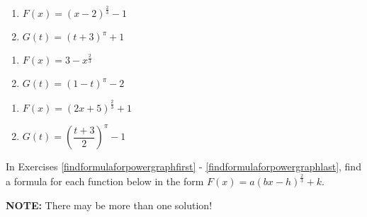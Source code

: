 \documentclass{ximera}
\begin{document}
\begin{multicols}{2}
\begin{enumerate}

\item $F(x) = (x-2)^{\frac{2}{3}}-1$ \label{powergraphexfirst}
\item $G(t) = (t+3)^{\pi} +1$

\setcounter{HW}{\value{enumi}}
\end{enumerate}
\end{multicols}

\begin{multicols}{2}
\begin{enumerate}
\setcounter{enumi}{\value{HW}}
\item $F(x) = 3-x^{\frac{2}{3}}$ 
\item $G(t) = (1-t)^{\pi}-2$  

\setcounter{HW}{\value{enumi}}
\end{enumerate}
\end{multicols}


\begin{multicols}{2}
\begin{enumerate}
\setcounter{enumi}{\value{HW}}

\item $F(x) =(2x+5)^{\frac{2}{3}}+1$ 
\item $G(t) = \left( \dfrac{t+3}{2}\right)^{\pi}-1$ \label{powergraphexlast}
\setcounter{HW}{\value{enumi}}
\end{enumerate}
\end{multicols}

In Exercises \ref{findformulaforpowergraphfirst} - \ref{findformulaforpowergraphlast}, find a formula for each function below in the form $F(x) = a(bx-h)^{\frac{2}{3}}+k$.

\smallskip

\textbf{NOTE:}  There may be more than one solution!
\end{document}
